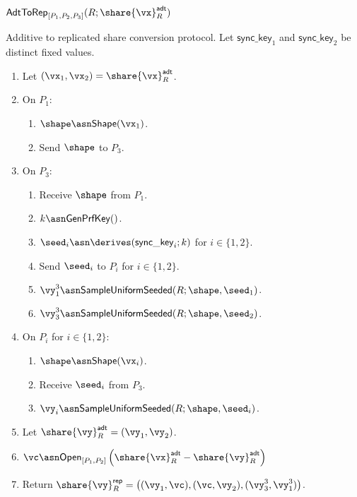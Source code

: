 
\msubsubsection
{$\mathsf{AdtToRep}_{[P_1, P_2, P_3]}(R; \share{\vx}^{\mathsf{adt}}_{R})$}
\label{fig:two-to-three}

Additive to replicated share conversion protocol. Let $\mathsf{sync\_key}_1$ and
$\mathsf{sync\_key}_2$ be distinct fixed values.

\begin{enumerate}
\item Let $(\vx_1, \vx_2) = \share{\vx}^{\mathsf{adt}}_{R}$.

\item On $P_1$:
\begin{enumerate}
  \item $\shape \asn \mathsf{Shape}(\vx_1)$.
  \item Send $\shape$ to $P_3$.
\end{enumerate}

\item On $P_3$:
\begin{enumerate}
  \item Receive $\shape$ from $P_1$.
  \item $k \asn \mathsf{GenPrfKey}()$.
  \item $\seed_i \asn \derives(\mathsf{sync\_key}_i; k)$ for $i \in \{1, 2\}$.
  \item Send $\seed_i$ to $P_i$ for $i \in \{1, 2\}$.
  \item $\vy_1^3 \asn \mathsf{SampleUniformSeeded}(R; \shape, \seed_1)$.
  \item $\vy_3^3 \asn \mathsf{SampleUniformSeeded}(R; \shape, \seed_2)$.
\end{enumerate}

\item On $P_i$ for $i \in \{1,2\}$:
\begin{enumerate}
  \item $\shape \asn \mathsf{Shape}(\vx_i)$.
  \item Receive $\seed_i$ from $P_3$.
  \item $\vy_i \asn \mathsf{SampleUniformSeeded}(R; \shape, \seed_i)$.
\end{enumerate}

\item Let $\share{\vy}^{\mathsf{adt}}_{R} = (\vy_1, \vy_2)$.

\item $\vc \asn \mathsf{Open}_{[P_1, P_2]}\left( \share{\vx}^{\mathsf{adt}}_{R} - \share{\vy}^{\mathsf{adt}}_{R} \right)$

\item Return $\share{\vy}^{\mathsf{rep}}_{R} = \left( (\vy_1, \vc), (\vc, \vy_2), (\vy_3^3, \vy_1^3) \right)$.
\end{enumerate}


